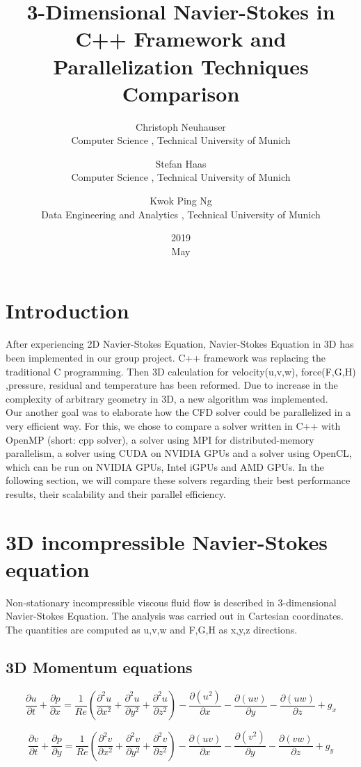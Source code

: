 \documentclass{article}%
\title{3-Dimensional Navier-Stokes in C++ Framework and Parallelization Techniques Comparison }
\date{2019\\ May}
\author{Christoph Neuhauser\\ Computer Science , Technical University of Munich 
\and Stefan Haas\\ Computer Science , Technical University of Munich
\and Kwok Ping Ng\\ Data Engineering and Analytics , Technical University of Munich}
\begin{document}
\maketitle

\section{Introduction}

After experiencing 2D Navier-Stokes Equation, Navier-Stokes Equation in 3D has been implemented in our group project.  C++ framework was replacing the traditional C programming. Then 3D calculation for velocity(u,v,w), force(F,G,H) ,pressure, residual and temperature has been reformed.  Due to increase in the complexity of arbitrary geometry in 3D, a new algorithm was implemented.\\
Our another goal was to elaborate how the CFD solver could be parallelized in a very efficient way. For this, we chose to compare a solver written in C++ with OpenMP (short: cpp solver), a solver using MPI for distributed-memory parallelism, a solver using CUDA on NVIDIA GPUs and a solver using OpenCL, which can be run on NVIDIA GPUs, Intel iGPUs and AMD GPUs. In the following section, we will compare these solvers regarding their best performance results, their scalability and their parallel efficiency.

\section{3D incompressible Navier-Stokes equation}
Non-stationary incompressible viscous fluid flow is described in 3-dimensional Navier-Stokes Equation. The analysis was carried out in Cartesian coordinates. The quantities are computed as u,v,w and F,G,H as x,y,z directions.

\subsection{3D Momentum equations}
\begin{equation}
\frac{\partial u}{\partial t} + \frac{\partial p}{\partial x} = 
\frac{1}{Re} \left( \frac{\partial^2 u}{\partial x^2} + \frac{\partial^2 u}{\partial y^2} + \frac{\partial^2 u}{\partial z^2} \right) - 
\frac{\partial(u^2)}{\partial x} -\frac{\partial (uv)}{\partial y} - 
\frac{\partial (uw)}{\partial z} +
g_x 
\end{equation}

\begin{equation}
\frac{\partial v}{\partial t} + \frac{\partial p}{\partial y} = 
\frac{1}{Re} \left( \frac{\partial^2 v}{\partial x^2} + \frac{\partial^2 v}{\partial y^2} + \frac{\partial^2 v}{\partial z^2} \right) - 
\frac{\partial(uv)}{\partial x} -\frac{\partial (v^2)}{\partial y} - 
\frac{\partial (vw)}{\partial z} +
g_y
\end{equation}
\end{document}
